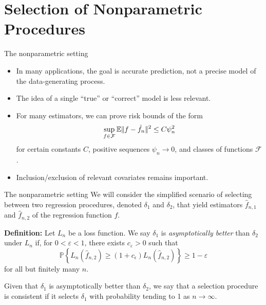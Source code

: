 \documentclass{beamer}
\newcommand{\0}{\emptyset}
\newcommand{\prob}{\mathbb{P}}
\newcommand{\E}{\mathbb{E}}
\newcommand{\paren}[1]{\left(#1 \right)}
\newcommand{\set}[1]{\left\{ #1 \right\}}
\newcommand{\norm}[1]{|\hspace{-1pt}|#1 |\hspace{-1pt}|}
\newcommand{\normsq}[1]{\norm{#1}^{2}}
\newcommand{\Fcal}{\mathcal{F}}
\newcommand{\Loss}[1]{L_{n}\paren{#1}}
\newcommand{\fhat}[2]{\hat{f}_{#1, #2}}
\newcommand{\1}{\mathmybb{1}}
\begin{document}
\section{Selection of Nonparametric Procedures}\label{sec:yang}
\begin{frame}{The nonparametric setting}
  \begin{itemize}
    \item In many applications, the goal is accurate prediction, not a precise model of the data-generating process.

    \item The idea of a single “true” or “correct” model is less relevant.
    
    \item For many estimators, we can prove risk bounds of the form
    \[\sup_{f\in\Fcal}\E{\normsq{f - \hat{f}_{n}}} \leq C\psi_{n}^{2}\]
    for certain constants \(C\), positive sequences \(\psi_{n}\to 0\), and classes of functions \(\Fcal\).

    \item Inclusion/exclusion of relevant covariates remains important.
  \end{itemize}
\end{frame}

\begin{frame}{The nonparametric setting}
  We will consider the simplified scenario of selecting between two regression procedures, denoted \alert{\(\delta_{1}\)} and \alert{\(\delta_{2}\)}, that yield estimators \alert{\(\hat{f}_{n, 1}\)} and \alert{\(\hat{f}_{n, 2}\)} of the regression function \(f\).

  \textbf{Definition:}
  Let \(L_{n}\) be a loss function. We say \(\delta_{1}\) is \alert{\emph{asymptotically better}} than \(\delta_{2}\) under \(L_{n}\) if, for \(0<\varepsilon<1\), there exists \(c_{\varepsilon}>0\) such that
  \[\prob\set{\Loss{\fhat{n}{2}}\geq (1+c_{\epsilon})\Loss{\fhat{n}{2}} }\geq 1-\varepsilon\]
  for all but finitely many \(n\).

  Given that \(\delta_{1}\) is asymptotically better than \(\delta_{2}\), we say that a selection procedure is \alert{consistent} if it selects \(\delta_{1}\) with probability tending to 1 as \(n\to\infty\).
\end{frame}
\end{document}
